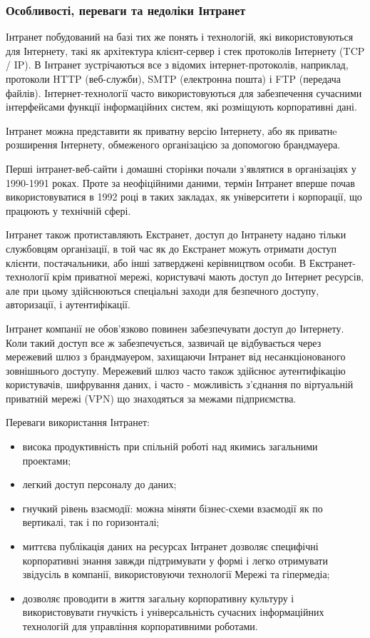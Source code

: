 \subsubsection{Особливості, переваги та недоліки Інтранет}
Інтранет побудований на базі тих же понять і технологій, які використовуються для Інтернету, такі як архітектура клієнт-сервер і стек протоколів Інтернету (TCP / IP). 
В Інтранет зустрічаються все з відомих інтернет-протоколів, наприклад, протоколи HTTP (веб-служби), SMTP (електронна пошта) і FTP (передача файлів). 
Інтернет-технології часто використовуються для забезпечення сучасними інтерфейсами функції інформаційних систем, які розміщують корпоративні дані.
\par Інтранет можна представити як приватну версію Інтернету, або як приватнe розширення Інтернету, обмеженого організацією за допомогою брандмауера. 
\par Перші інтранет-веб-сайти і домашні сторінки почали з'являтися в організаціях у 1990-1991 роках. 
Проте за неофіційними даними, термін Інтранет вперше почав використовуватися в 1992 році в таких закладах, як університети і корпорації, що працюють у технічній сфері.
\par Інтранет також протиставляють Екстранет, доступ до Інтранету надано тільки службовцям організації, в той час як до Екстранет можуть отримати доступ клієнти, постачальники, або інші затверджені керівництвом особи. 
В Екстранет-технології крім приватної мережі, користувачі мають доступ до Інтернет ресурсів, але при цьому здійснюються спеціальні заходи для безпечного доступу, авторизації, і аутентифікації.
\par Інтранет компанії не обов'язково повинен забезпечувати доступ до Інтернету. 
Коли такий доступ все ж забезпечується, зазвичай це відбувається через мережевий шлюз з брандмауером, захищаючи Інтранет від несанкціонованого зовнішнього доступу. 
Мережевий шлюз часто також здійснює аутентифікацію користувачів, шифрування даних, і часто - можливість з'єднання по віртуальній приватній мережі (VPN) що знаходяться за межами підприємства.

Переваги використання Інтранет:
\begin{itemize}
\item висока продуктивність при спільній роботі над якимись загальними проектами;
\item легкий доступ персоналу до даних;
\item гнучкий рівень взаємодії: можна міняти бізнес-схеми взаємодії як по вертикалі, так і по горизонталі;
\item миттєва публікація даних на ресурсах Інтранет дозволяє специфічні корпоративні знання завжди підтримувати у формі і легко отримувати звідусіль в компанії, використовуючи технології Мережі та гіпермедіа;
\item дозволяє проводити в життя загальну корпоративну культуру і використовувати гнучкість і універсальність сучасних інформаційних технологій для управління корпоративними роботами.
\end{itemize}


